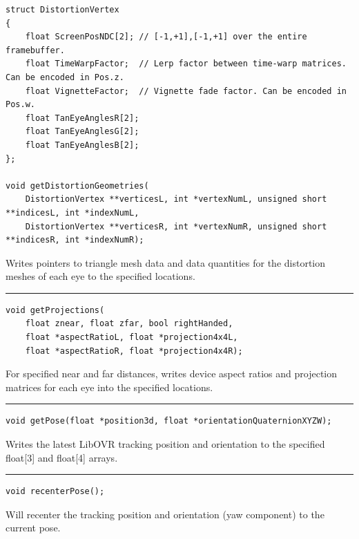 \documentclass[]{article}
\begin{document}
\begin{verbatim}
struct DistortionVertex
{
    float ScreenPosNDC[2]; // [-1,+1],[-1,+1] over the entire framebuffer.
    float TimeWarpFactor;  // Lerp factor between time-warp matrices. Can be encoded in Pos.z.
    float VignetteFactor;  // Vignette fade factor. Can be encoded in Pos.w.
    float TanEyeAnglesR[2];
    float TanEyeAnglesG[2];
    float TanEyeAnglesB[2];
};

void getDistortionGeometries(
    DistortionVertex **verticesL, int *vertexNumL, unsigned short **indicesL, int *indexNumL,
    DistortionVertex **verticesR, int *vertexNumR, unsigned short **indicesR, int *indexNumR);
\end{verbatim}

Writes pointers to triangle mesh data and data quantities for the
distortion meshes of each eye to the specified locations.

\begin{center}\rule{0.5\linewidth}{\linethickness}\end{center}

\begin{verbatim}
void getProjections(
    float znear, float zfar, bool rightHanded,
    float *aspectRatioL, float *projection4x4L,
    float *aspectRatioR, float *projection4x4R);
\end{verbatim}

For specified near and far distances, writes device aspect ratios and
projection matrices for each eye into the specified locations.

\begin{center}\rule{0.5\linewidth}{\linethickness}\end{center}

\begin{verbatim}
void getPose(float *position3d, float *orientationQuaternionXYZW);
\end{verbatim}

Writes the latest LibOVR tracking position and orientation to the
specified float{[}3{]} and float{[}4{]} arrays.

\begin{center}\rule{0.5\linewidth}{\linethickness}\end{center}

\begin{verbatim}
void recenterPose();
\end{verbatim}

Will recenter the tracking position and orientation (yaw component) to
the current pose.
\end{document}
